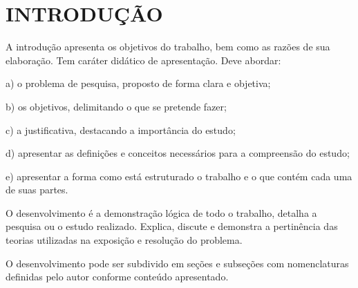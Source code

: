 \documentclass[../main.tex]{subfiles}
\begin{document}
\chapter{INTRODUÇÃO} %


A introdução apresenta os objetivos do trabalho, bem como as razões de sua elaboração. Tem caráter didático de apresentação.
Deve abordar:

    a) o problema de pesquisa, proposto de forma clara e objetiva;
    
    b) os objetivos, delimitando o que se pretende fazer;
    
    c) a justificativa, destacando a importância do estudo;
    
    d) apresentar as definições e conceitos necessários para a compreensão do estudo;
    
    e) apresentar a forma como está estruturado o trabalho e o que contém cada uma de suas partes.
    
O desenvolvimento é a demonstração lógica de todo o trabalho, detalha a pesquisa ou o estudo realizado. Explica, discute e demonstra a pertinência das teorias utilizadas na exposição e resolução do problema. 

O desenvolvimento pode ser subdivido em seções e subseções com nomenclaturas definidas pelo autor conforme conteúdo apresentado. 
\end{document}
